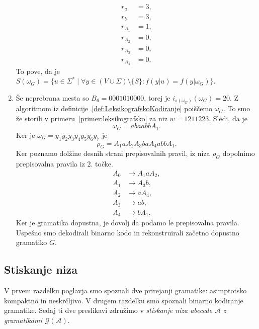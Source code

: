 \documentclass[fin1, tisk]{fmfdelo}
\newcommand{\A}{\mathcal{A}}
\newcommand{\G}{\mathcal{G}}
\theoremstyle{definition}
\begin{document}
\begin{primer}
\begin{enumerate}
        \begin{align*}
            r_a &= 3,\\
            r_b &= 3,\\
            r_{A_1} &= 1,\\
            r_{A_2} &= 0,\\
            r_{A_3} &= 0,\\
            r_{A_4} &= 0.
        \end{align*}
        To pove, da je $S(\omega_G) = \bigl\{ u \in \Sigma^* \mid \forall y \in (V \cup \Sigma) 
        \setminus \{ S \} \colon f(y|u) = f(y|\omega_G) \bigr\}$.
        \item Še neprebrana mesta so $B_6 = 0001010000$, torej je $i_{s(\omega_G)}(\omega_G) = 20$.
        Z algoritmom iz definicije~\ref{def:LeksikografskoKodiranje} poiščemo $\omega_G$. To smo 
        že storili v primeru~\ref{primer:leksikografsko} za niz $w = 1211223$. Sledi, da je
        \[
            \omega_G = abaabbA_1.
        \]
        Ker je $\omega_G = y_1y_2y_3y_4y_5y_6y_7$ je
        \[
            \rho_G = A_1aA_2A_3baA_4abbA_1.
        \]
        Ker poznamo dolžine desnih strani prepisovalnih pravil, iz niza $\rho_G$ dopolnimo 
        prepisovalna pravila iz $2.$ točke.
        \begin{align*}
            A_0 &\rightarrow A_1aA_2, \\
            A_1 &\rightarrow A_3b, \\
            A_2 &\rightarrow aA_4, \\
            A_3 &\rightarrow ab, \\
            A_4 &\rightarrow bA_1.
        \end{align*}
        Ker je gramatika dopustna, je dovolj da podamo le prepisovalna pravila. Uspešno smo
        dekodirali binarno kodo in rekonstruirali začetno dopustno gramatiko $G$.
    \end{enumerate}
\end{primer}

\subsection{Stiskanje niza}\label{subsection:StiskanjeNiza}

V prvem razdelku poglavja smo spoznali dve prirejanji gramatike: asimptotsko kompaktno in neskrčljivo.
V drugem razdelku smo spoznali binarno kodiranje gramatike. Sedaj ti dve preslikavi združimo v  
\emph{stiskanje niza abecede $\A$ z gramatikami $\G(\A)$}.
\end{document}
